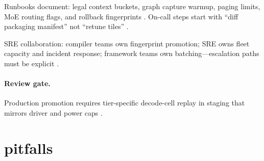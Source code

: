 Runbooks document: legal context buckets, graph capture warmup, paging limits, MoE routing flags, and rollback fingerprints \citep{kwon2023vllm,liu2024deepseekv3,yirage2026,chen2020compilerbasedhardw,patel2025llminference,memoryfloor2026,taxbreak2026,amd2024aie,dlbook,semianalysis2024tma,amd2024xdna,dao2022flashattention,dao2023flashdecoding,nvidia2024cudagraphs,nvidia2022hopper}. On-call steps start with ``diff packaging manifest'' not ``retune tiles'' \citep{patel2025llminference,yirage2026,chen2020compilerbasedhardw,memoryfloor2026,taxbreak2026,kwon2023vllm,liu2024deepseekv3,amd2024aie,dlbook,semianalysis2024tma,amd2024xdna,dao2022flashattention,dao2023flashdecoding,nvidia2024cudagraphs,nvidia2022hopper}.

SRE collaboration: compiler teams own fingerprint promotion; SRE owns fleet capacity and incident response; framework teams own batching---escalation paths must be explicit \citep{kwon2023vllm,patel2025llminference,yirage2026,chen2020compilerbasedhardw,liu2024deepseekv3,memoryfloor2026,taxbreak2026,amd2024aie,dlbook,semianalysis2024tma,amd2024xdna,dao2022flashattention,dao2023flashdecoding,nvidia2024cudagraphs,nvidia2022hopper}.

\paragraph{Review gate.} Production promotion requires tier-specific decode-cell replay in staging that mirrors driver and power caps \citep{memoryfloor2026,patel2025llminference,yirage2026,chen2020compilerbasedhardw,kwon2023vllm,liu2024deepseekv3,taxbreak2026,amd2024aie,dlbook,semianalysis2024tma,amd2024xdna,dao2022flashattention,dao2023flashdecoding,nvidia2024cudagraphs,nvidia2022hopper}.

\section{pitfalls}
\label{sec:ch26_pitfalls}

